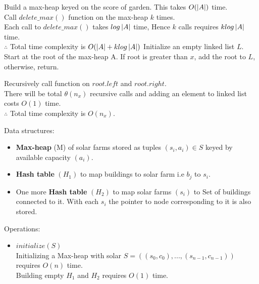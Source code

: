 \documentclass[12pt,twoside]{article}
\begin{document}
\begin{problems}
\newpage
\problem  %
\begin{problemparts}
\problempart %
Build a max-heap keyed on the score of garden.
This takes $O(\left| A\right|)$ time. \\
Call $delete\_max()$ function on the max-heap $k$ times. \\
Each call to $delete\_max()$ takes $log\left| A\right|$ time, Hence $k$ calls requires $klog\left| A\right|$ time. \\

$\therefore$ Total time complexity is $O(\left| A\right| + klog\left| A\right|)$
\problempart %
Initialize an empty linked list $L$. \\
Start at the root of the max-heap A. If root is greater than $x$, add the root to $L$, otherwise, return.

Recursively call function on $root.left$ and $root.right$. \\
There will be total $\theta(n_x)$ recursive calls and adding an element to linked list costs $O(1)$ time. \\

$\therefore$ Total time complexity is $O(n_x)$.\\
\end{problemparts}

\newpage
\problem  %

Data structures:
\begin{itemize}
    \item \textbf{Max-heap} (M) of solar farms stored as tuples $(s_i, a_i) \in S$ keyed by available capacity $(a_i)$.
    \item \textbf{Hash table} $(H_1)$ to map buildings to solar farm i.e  $b_j$ to $s_i$. 
    \item One more \textbf{Hash table} $(H_2)$ to map solar farms $(s_i)$ to Set of buildings connected to it. With each $s_i$ the pointer to node corresponding to it is also stored.
\end{itemize}

Operations:
\begin{itemize}
    \item $initialize(S)$ \\
    Initializing a Max-heap with solar $S = ((s_0, c_0), ..., (s_{n-1}, c_{n-1}))$ requires $O(n)$ time. \\
    Building empty $H_1$ and $H_2$ requires $O(1)$ time.
    

\end{itemize}
\end{problems}
\end{document}
